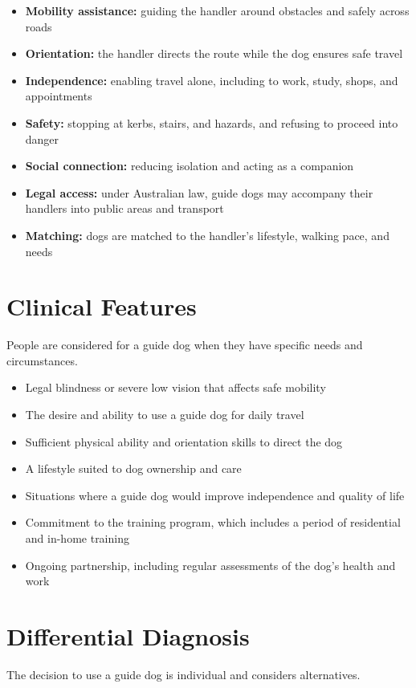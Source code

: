 \begin{itemize}
    \item \textbf{Mobility assistance:} guiding the handler around obstacles and safely across roads
    \item \textbf{Orientation:} the handler directs the route while the dog ensures safe travel
    \item \textbf{Independence:} enabling travel alone, including to work, study, shops, and appointments
    \item \textbf{Safety:} stopping at kerbs, stairs, and hazards, and refusing to proceed into danger
    \item \textbf{Social connection:} reducing isolation and acting as a companion
    \item \textbf{Legal access:} under Australian law, guide dogs may accompany their handlers into public areas and transport
    \item \textbf{Matching:} dogs are matched to the handler's lifestyle, walking pace, and needs
\end{itemize}

\section*{Clinical Features}
People are considered for a guide dog when they have specific needs and circumstances.

\begin{itemize}
    \item Legal blindness or severe low vision that affects safe mobility
    \item The desire and ability to use a guide dog for daily travel
    \item Sufficient physical ability and orientation skills to direct the dog
    \item A lifestyle suited to dog ownership and care
    \item Situations where a guide dog would improve independence and quality of life
    \item Commitment to the training program, which includes a period of residential and in-home training
    \item Ongoing partnership, including regular assessments of the dog's health and work
\end{itemize}

\section*{Differential Diagnosis}
The decision to use a guide dog is individual and considers alternatives.

